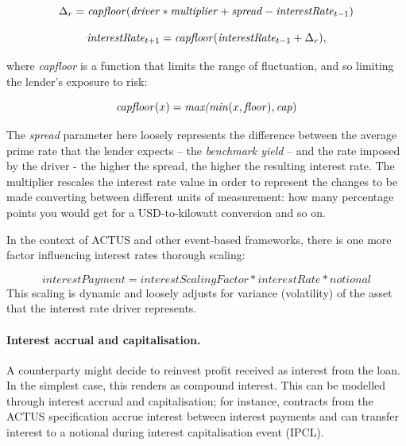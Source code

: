 \documentclass[runningheads]{llncs}
\newcommand{\ident}[1]{\mbox{\emph{#1}}}
\begin{document}
\noindent 
\begin{equation}
\Delta_{r}=\ident{capfloor}(\ident{driver}*\ident{multiplier}+\ident{spread}-\ident{interestRate}_{t-1})
\end{equation}

\noindent 
\begin{equation}
\ident{interestRate}_{t+1}=\ident{capfloor}(\ident{interestRate}_{t-1}+\Delta_{r}),
\end{equation}

\noindent
where \emph{capfloor} is a function that limits the range of fluctuation,  
and so limiting the lender's exposure to risk:

\noindent 
\begin{equation}
\ident{capfloor}(x)=\ident{max(min}(x,\ident{floor}),\ident{cap})
\end{equation}

\noindent
The \emph{spread} parameter here loosely represents the difference between
the average prime 
rate that the lender expects -- the \emph{benchmark yield} -- and
the rate imposed by the driver - the higher the spread, the higher
the resulting interest rate. The multiplier %
rescales the interest rate value 
in order to represent the changes to be made converting between different units
of measurement: how many percentage points 
you would get for a USD-to-kilowatt conversion
and so on.

In the context of ACTUS and other event-based frameworks, 
there is
one more factor influencing interest rates thorough scaling:

\noindent 
\begin{equation}
interestPayment=interestScalingFactor*interestRate*notional
\end{equation}
\noindent
This scaling is dynamic and loosely adjusts for variance (volatility)
of the asset that the interest rate driver represents.

\paragraph*{Interest accrual and capitalisation. }

A counterparty might decide to reinvest profit received as interest
from the %
loan. In the simplest case, this renders as compound
interest. This can be modelled through interest accrual and capitalisation;
for instance, contracts from the ACTUS specification accrue interest
between interest payments and can transfer interest to a notional
during interest capitalisation event (IPCL).
\end{document}
